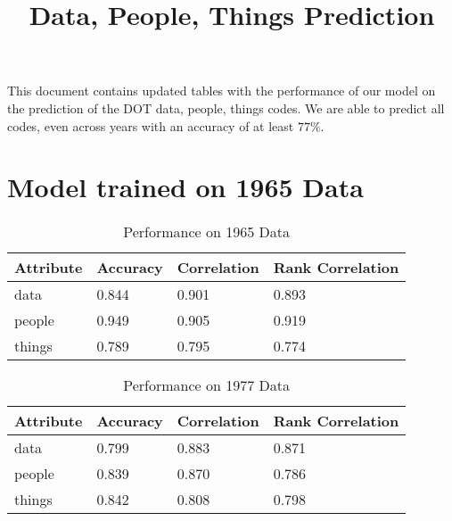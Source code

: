 \documentclass[11pt]{article}
\title{Data, People, Things Prediction}
\begin{document}
\maketitle

This document contains updated tables with the performance of our model on the prediction of the DOT data, people, things codes. We are able to predict all codes, even across years with an accuracy of at least $77\%$.

\section{Model trained on 1965 Data}
  \begin{table}[h!]
    \centering
    \caption{Performance on 1965 Data}
    \label{table:dpt-1965}
    \begin{tabular}{|l|l|l|l|}
        \hline
        \textbf{Attribute} & \textbf{Accuracy} & \textbf{Correlation} & \textbf{Rank Correlation} \\ \hline
        data               & 0.844             & 0.901                & 0.893                     \\ \hline
        people             & 0.949             & 0.905                & 0.919                     \\ \hline
        things             & 0.789             & 0.795                & 0.774                     \\ \hline
    \end{tabular}
  \end{table}

    \begin{table}[h!]
      \centering
      \label{table:dpt-1977}
      \caption{Performance on 1977 Data}
      \begin{tabular}{|l|l|l|l|}
        \hline
        \textbf{Attribute} & \textbf{Accuracy} & \textbf{Correlation} & \textbf{Rank Correlation} \\ \hline
        data               & 0.799             & 0.883                & 0.871                     \\ \hline
        people             & 0.839             & 0.870                & 0.786                     \\ \hline
        things             & 0.842             & 0.808                & 0.798                     \\ \hline
      \end{tabular}
    \end{table}
\end{document}
